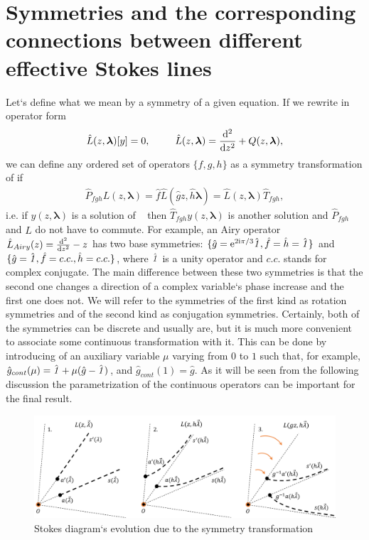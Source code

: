 \documentclass[12pt]{iopart}
\def\f{\hat{f}}
\def\g{\hat{g}}
\def\h{\hat{h}}
\def\L{\hat{L}}
\def\lmbd{\bm{\lambda}}
\def\unity{\hat{\it 1}}
\begin{document}
\section{Symmetries and the corresponding connections between different effective Stokes lines \label{sec:smmtrs}}
Let`s define what we mean by a symmetry of a given equation. If we rewrite  in operator form
\begin{eqnarray}
\L(z,\lmbd)[y]=0, \qquad \L(z,\lmbd)=\frac{\rmd^2}{\rmd z^2} + Q(z,\lmbd),   \label{eq:L}
\end{eqnarray}
we can define any ordered set of operators $\{f,g,h\}$ as a symmetry transformation of  if
\begin{eqnarray}
\hat{P}_{fgh}L(z,\lmbd)=\f\L(\g z,\h\lmbd)=\L(z,\lmbd)\hat{T}_{fgh},   \label{eq:symdef}
\end{eqnarray}
i.e. if $y(z,\lmbd)$ is a solution of ~ then $\hat{T}_{fgh}y(z,\lmbd)$ is another solution and $\hat{P}_{fgh}$ and $\L$ do not have to commute. 
For example, an Airy operator $\L_{Airy}(z) = \frac{\rmd^2}{\rmd z^2} - z$ has two base symmetries: 
$\{\g=\rme^{2 \rmi \pi/3}\unity,\f=\h=\unity\}$ 
and $\{\g=\unity,\f=c.c.,\h=c.c.\}$, where $\unity$ is a unity operator and $c.c.$ stands for complex conjugate. The main difference between these two symmetries is that the second one changes a direction of a complex variable`s phase increase and the first one does not. We will refer to the symmetries of the first kind as rotation symmetries and of the second kind as conjugation symmetries. Certainly, both of the symmetries can be discrete and usually are, but it is much more convenient to associate some continuous transformation with it. This can be done by introducing of an auxiliary variable $\mu$ varying from $0$ to $1$ such that, for example, $\g_{cont}(\mu)=\unity+\mu (\g-\unity)$, and $\g_{cont}(1)=\g$. As it will be seen from the following discussion the parametrization of the continuous operators can be important for the final result.

\begin{figure}
\centering
\noindent
\includegraphics[scale=.5]{stuff/rs.png}
\caption{Stokes diagram`s evolution due to the symmetry transformation}
\label{fig:rst}
\end{figure} 
\end{document}
